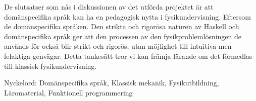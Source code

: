 \begin{binge}
De slutsatser som nås i diskussionen av det utförda projektet är att
domänspecifika språk kan ha en pedagogisk nytta i
fysikundervisning. Eftersom de domänspecifika språken. Den strikta och
rigorösa naturen av Haskell och domänspecifika språk ger att den
processen av den fysikproblemlösningen de används för också blir
strikt och rigorös, utan möjlighet till intuitiva men felaktiga
genvägar. Detta tankesätt tror vi kan främja lärande om det förmedlas
till klassisk fysikundervisning.

\vfill
Nyckelord: Domänspecifika språk, Klassisk mekanik, Fysikutbildning, Läromaterial, Funktionell programmering

\end{binge}

\newpage				%
\thispagestyle{empty}
\mbox{}
